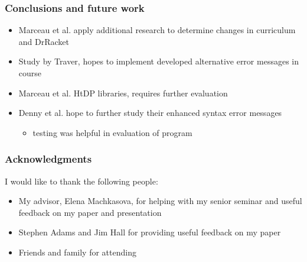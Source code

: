 \documentclass{beamer}
\begin{document}
\begin{frame}
	\frametitle{Conclusions and future work}
		\begin{itemize}
			\item Marceau et al. apply additional research to determine changes in curriculum and DrRacket
			\item Study by Traver, hopes to implement developed alternative error messages in course
			\item Marceau et al. HtDP libraries, requires further evaluation
			\item Denny et al. hope to further study their enhanced syntax error messages
			\begin{itemize}
				\item testing was helpful in evaluation of program
			\end{itemize}	
		\end{itemize}

\end{frame}




\begin{frame}
	\frametitle{Acknowledgments}
	I would like to thank the following people:
		\begin{itemize}
			\item My advisor, Elena Machkasova, for helping with my senior seminar and useful feedback on my paper and presentation
			\item Stephen Adams and Jim Hall for providing useful feedback on my paper
			\item Friends and family for attending
		\end{itemize}

\end{frame}
\end{document}
